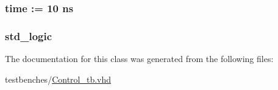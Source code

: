 \hypertarget{class_control__tb_1_1behavior_a13e9f2c03e76b8759ca75c4759b3aed6}{
\subsubsection[{clk\-\_\-period}]{ {\bfseries time  \-:=  10  ns } }}\label{class_control__tb_1_1behavior_a13e9f2c03e76b8759ca75c4759b3aed6}
\hypertarget{class_control__tb_1_1behavior_aca7354d71943883837f9a10b804a321f}{
\subsubsection[{clk}]{ {\bfseries std\-\_\-logic } }}\label{class_control__tb_1_1behavior_aca7354d71943883837f9a10b804a321f}


\-The documentation for this class was generated from the following files\-:\begin{DoxyCompactItemize}
\item 
testbenches/\hyperlink{_control__tb_8vhd}{\-Control\-\_\-tb.\-vhd}\end{DoxyCompactItemize}
